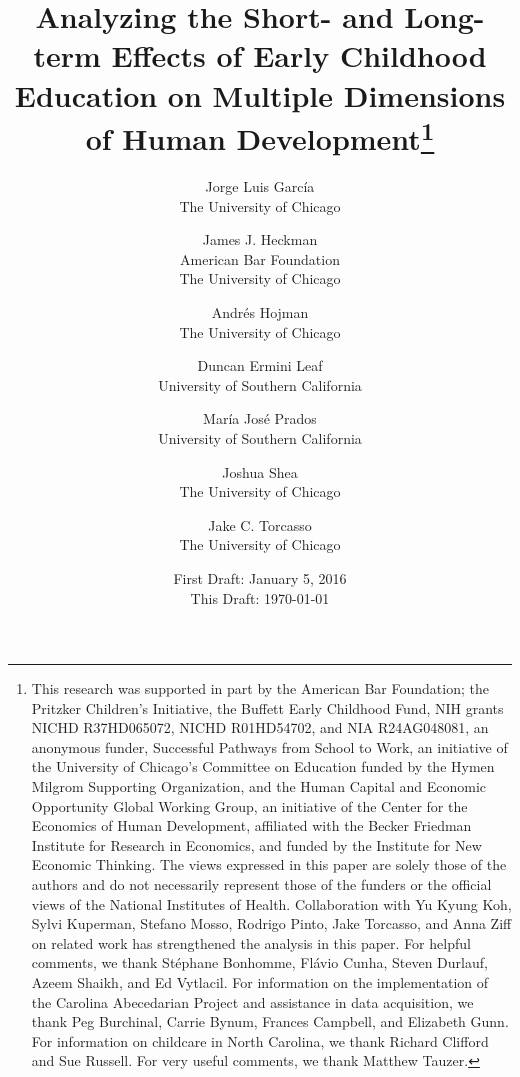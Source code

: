 






\title{\Large \textbf{Analyzing the Short- and Long-term Effects of Early Childhood Education on Multiple Dimensions of Human Development}\thanks{This research was supported in part by the American Bar Foundation; the Pritzker Children's Initiative, the
Buffett Early Childhood Fund, NIH grants NICHD R37HD065072, NICHD R01HD54702, and NIA R24AG048081, an
anonymous funder, Successful Pathways from School to Work, an initiative of the University of Chicago's Committee
on Education funded by the Hymen Milgrom Supporting Organization, and the Human Capital and Economic
Opportunity Global Working Group, an initiative of the Center for the Economics of Human Development, affiliated with
the Becker Friedman Institute for Research in Economics, and funded by the Institute for New Economic Thinking. The
views expressed in this paper are solely those of the authors and do not necessarily represent those of the funders or
the official views of the National Institutes of Health. Collaboration with Yu Kyung Koh, Sylvi Kuperman, Stefano Mosso, Rodrigo Pinto, Jake Torcasso, and Anna Ziff on related work has strengthened the analysis in this paper. For helpful comments, we thank St\'{e}phane Bonhomme, Fl\'{a}vio Cunha, Steven Durlauf, Azeem Shaikh, and Ed Vytlacil. For information on the implementation of the Carolina Abecedarian Project and assistance in data acquisition, we thank Peg Burchinal, Carrie Bynum, Frances Campbell, and Elizabeth Gunn. For information on childcare in North Carolina, we thank Richard Clifford and Sue Russell. For very useful comments, we thank Matthew Tauzer.}}

\author{
Jorge Luis Garc\'{i}a\\
The University of Chicago \and
James J. Heckman \\
American Bar Foundation \\
The University of Chicago \and
Andr\'{e}s Hojman\\
The University of Chicago \and
Duncan Ermini Leaf \\ 
University of Southern California \and
Mar\'{i}a Jos\'{e} Prados \\
University of Southern California \and
Joshua Shea \\
The University of Chicago \and 
Jake C. Torcasso\\
The University of Chicago}
\date{First Draft: January 5, 2016\\ This Draft: \today}
\maketitle
\thispagestyle{empty}

